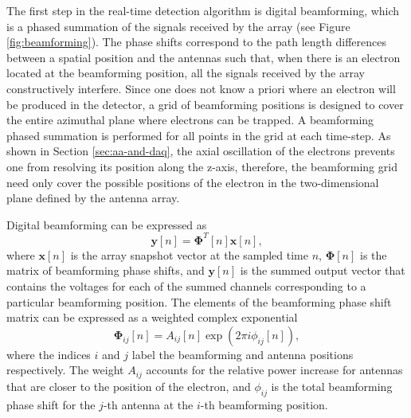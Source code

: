 The first step in the real-time detection algorithm is digital beamforming, which is a phased summation of the signals received by the array (see Figure \ref{fig:beamforming}). The phase shifts correspond to the path length differences between a spatial position and the antennas such that, when there is an electron located at the beamforming position, all the signals received by the array constructively interfere. Since one does not know a priori where an electron will be produced in the detector, a grid of beamforming positions is designed to cover the entire azimuthal plane where electrons can be trapped. A beamforming phased summation is performed for all points in the grid at each time-step. As shown in Section \ref{sec:aa-and-daq}, the axial oscillation of the electrons prevents one from resolving its position along the z-axis, therefore, the beamforming grid need only cover the possible positions of the electron in the two-dimensional plane defined by the antenna array. 

Digital beamforming can be expressed as
\begin{equation}
    \mathbf{y}[n] = \mathbf{\Phi}^T[n]\mathbf{x}[n],
    \label{eq:beamforming}
\end{equation}
where $\mathbf{x}[n]$ is the array snapshot vector at the sampled time $n$, $\mathbf{\Phi}[n]$ is the matrix of beamforming phase shifts, and $\mathbf{y}[n]$ is the summed output vector that contains the voltages for each of the summed channels corresponding to a particular beamforming position. %
The elements of the beamforming phase shift matrix can be expressed as a weighted complex exponential
\begin{equation}
    \mathbf{\Phi}_{ij}[n]=A_{ij}[n]\exp{\left(2\pi i\phi_{ij}[n]\right)},
\end{equation}
where the indices $i$ and $j$ label the beamforming and antenna positions respectively. The weight $A_{ij}$ accounts for the relative power increase for antennas that are closer to the position of the electron, and $\phi_{ij}$ is the total beamforming phase shift for the $j$-th antenna at the $i$-th beamforming position.

